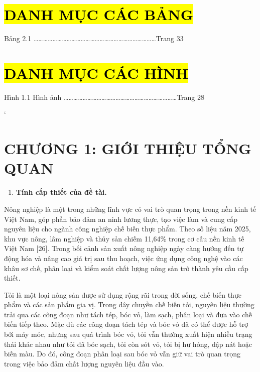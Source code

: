 \documentclass[
]{article}
\begin{document}
\section{\texorpdfstring{\hl{DANH MỤC CÁC
BẢNG}}{DANH MỤC CÁC BẢNG}}\label{danh-mux1ee5c-cuxe1c-bux1ea3ng}

Bảng 2.1
\ldots\ldots\ldots\ldots\ldots\ldots\ldots\ldots\ldots\ldots\ldots\ldots\ldots\ldots\ldots\ldots\ldots\ldots\ldots\ldots\ldots\ldots\ldots\ldots\ldots\ldots Trang
33

\section{\texorpdfstring{\hl{DANH MỤC CÁC
HÌNH}}{DANH MỤC CÁC HÌNH}}\label{danh-mux1ee5c-cuxe1c-huxecnh}

Hình 1.1 Hình ảnh
\ldots\ldots\ldots\ldots\ldots\ldots\ldots\ldots\ldots\ldots\ldots\ldots\ldots\ldots\ldots\ldots\ldots\ldots\ldots\ldots\ldots\ldots\ldots\ldots Trang
28

`

\section{\texorpdfstring{CHƯƠNG 1: GIỚI THIỆU TỔNG QUAN
}{CHƯƠNG 1: GIỚI THIỆU TỔNG QUAN }}\label{chux1b0ux1a1ng-1-giux1edbi-thiux1ec7u-tux1ed5ng-quan}

\begin{enumerate}
\def\labelenumi{\arabic{enumi}.}
\item
  \protect{}\label{_bookmark9}{}\textbf{Tính cấp thiết của
  đề tài.}
\end{enumerate}

Nông nghiệp là một trong những lĩnh vực có vai trò quan trọng trong nền
kinh tế Việt Nam, góp phần bảo đảm an ninh lương thực, tạo việc làm và
cung cấp nguyên liệu cho ngành công nghiệp chế biến thực phẩm. Theo số
liệu năm 2025, khu vực nông, lâm nghiệp và thủy sản chiếm 11,64\% trong
cơ cấu nền kinh tế Việt Nam {[}26{]}.
Trong bối cảnh sản xuất nông nghiệp ngày càng hướng đến tự động hóa và
nâng cao giá trị sau thu hoạch, việc ứng dụng công nghệ vào các khâu sơ
chế, phân loại và kiểm soát chất lượng nông sản trở thành yêu cầu cấp
thiết.

Tỏi là một loại nông sản được sử dụng rộng rãi trong đời sống, chế biến
thực phẩm và các sản phẩm gia vị. Trong dây chuyền chế biến tỏi, nguyên
liệu thường trải qua các công đoạn như tách tép, bóc vỏ, làm sạch, phân
loại và đưa vào chế biến tiếp theo. Mặc dù các công đoạn tách tép và bóc
vỏ đã có thể được hỗ trợ bởi máy móc, nhưng sau quá trình bóc vỏ, tỏi
vẫn thường xuất hiện nhiều trạng thái khác nhau như tỏi đã bóc sạch, tỏi
còn sót vỏ, tỏi bị hư hỏng, dập nát hoặc biến màu. Do đó, công đoạn phân
loại sau bóc vỏ vẫn giữ vai trò quan trọng trong việc bảo đảm chất lượng
nguyên liệu đầu vào.
\end{document}
